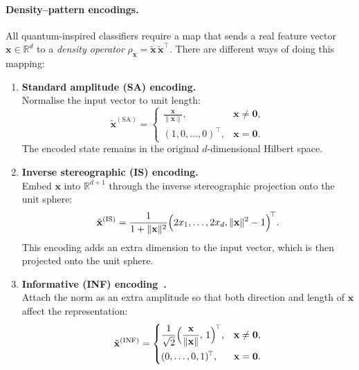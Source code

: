 \documentclass[twocolumn]{article} %
\begin{document}
\paragraph{Density--pattern encodings.}\label{par:encodings}
All quantum-inspired classifiers require a map that
sends a real feature vector \(\mathbf x\in\mathbb R^{d}\) to a
\emph{density operator}
\(\rho_{\mathbf x}= \tilde{\mathbf x}\,
                    \tilde{\mathbf x}^{\!\top}\). There are different ways of doing this mapping:

\begin{enumerate}[leftmargin=*,label=\textbf{(\alph*)}]
\item \textbf{Standard amplitude (SA) encoding.}\\[2pt]
      Normalise the input vector to unit length:
      \[
        \tilde{\mathbf x}^{(\mathrm{SA})}
          =\begin{cases}
             \displaystyle\frac{\mathbf x}{\lVert\mathbf x\rVert},
               &\mathbf x\neq\mathbf 0,\\[6pt]
             (1,0,\dots,0)^{\!\top},&\mathbf x=\mathbf 0.
           \end{cases}
      \]
      The encoded state remains in the original \(d\)-dimensional
      Hilbert space.

\item \textbf{Inverse stereographic (IS) encoding.}\\[2pt]
      Embed \(\mathbf x\) into \(\mathbb R^{d+1}\) through the inverse
      stereographic projection onto the unit sphere:
      \[
        \tilde{\mathbf x}^{(\mathrm{IS})}
           =\frac{1}
                  {1+\lVert\mathbf x\rVert^{2}}
             \Bigl(2x_{1},\dots,2x_{d},
                   \lVert\mathbf x\rVert^{2}-1\Bigr)^{\!\top}.
      \]
      This encoding adds an extra dimension to the input vector, which is
      then projected onto the unit sphere.

\item \textbf{Informative (INF) encoding~\cite{Sergioli2025}.}\\[2pt]
      Attach the norm as an extra amplitude so that both direction and
      length of \(\mathbf x\) affect the representation:
      \[
        \tilde{\mathbf x}^{(\mathrm{INF})}
          =\begin{cases}
             \displaystyle
             \frac{1}{\sqrt{2}}
             \Bigl(\frac{\mathbf x}{\lVert\mathbf x\rVert},\,1\Bigr)^{\!\top},
               &\mathbf x\neq\mathbf 0,\\[8pt]
             (0,\dots,0,1)^{\!\top},
               &\mathbf x=\mathbf 0.
           \end{cases}
      \]
\end{enumerate}
\end{document}
